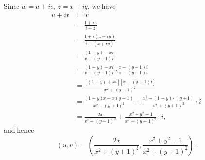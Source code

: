 \Question{\currfilebase}

Since \(w = u + iv\), \(z = x + iy\), we have
\begin{align*}
    u + iv & = w                                                                                                         \\
           & = \frac{1 + iz}{i + z}                                                                                      \\
           & = \frac{1 + i(x + iy)}{i + (x + iy)}                                                                        \\
           & = \frac{(1 - y) + xi}{x + (y + 1)i}                                                                         \\
           & = \frac{(1 - y) + xi}{x + (y + 1)i} \cdot \frac{x - (y + 1)i}{x - (y + 1)i}                                 \\
           & = \frac{\left[(1 - y) + xi\right] \left[x - (y + 1)i\right]}{x^2 + (y + 1)^2}                               \\
           & = \frac{(1 - y)x + x(y + 1)}{x^2 + (y + 1)^2} + \frac{x^2 - (1 - y) \cdot (y + 1)}{x^2 + (y + 1)^2} \cdot i \\
           & = \frac{2x}{x^2 + (y + 1)^2} + \frac{x^2 + y^2 - 1}{x^2 + (y + 1)^2} \cdot i,
\end{align*}
and hence
\[
    (u, v) = \left(\frac{2x}{x^2 + (y + 1)^2}, \frac{x^2 + y^2 - 1}{x^2 + (y + 1)^2}\right).
\]

